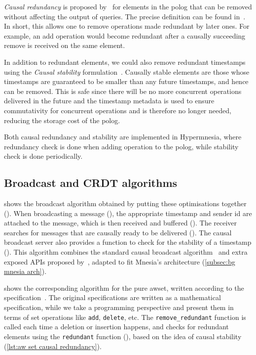 \emph{Causal redundancy} is proposed by~\citet{baquero2017PureOp} for elements in
the \acrshort{polog} that can be removed without affecting the output of
queries. The precise definition can be found in~\cite{baquero2017PureOp,baquero2014PureOp}. 
In short, this allows one to remove operations made redundant by later ones. For
example, an add operation would become redundant after a causally succeeding remove 
is received on the same element.

In addition to redundant elements, we could also remove redundant timestamps 
using the \emph{Causal stability} formulation~\citet{baquero2017PureOp}.
Causally stable elements are those whose timestamps are guaranteed to be smaller
than any future timestamps, and hence can be removed.
This is safe since there will be no more
concurrent operations delivered in the future and the timestamp metadata is
used to ensure commutativity for concurrent operations and is therefore no longer
needed, reducing the storage cost of the \acrshort{polog}.

Both causal redundancy and stability are implemented in Hypermnesia, where redundancy
check is done when adding operation to the \acrshort{polog}, while stability check 
is done periodically.

\subsection{Broadcast and CRDT algorithms} \label{subsec:impl pawset algorithm}

 shows the broadcast algorithm obtained by putting these optimisations
together (). 
When broadcasting a message (),
the appropriate timestamp and sender id are attached to the message, which is then
received and buffered (). The
receiver searches for messages that are causally ready to be delivered ().
The causal broadcast server also provides a function to check for the stability of a 
timestamp ().
This algorithm combines the standard causal broadcast
algorithm~\cite{birman1991causal,kleppmann2022dist-notes} and extra exposed 
APIs proposed by~\cite{baquero2014PureOp,baquero2017PureOp}, adapted to fit Mnesia's 
architecture (\cref{subsec:bg mnesia arch}).

 shows the corresponding algorithm for the pure \acrshort{awset},
written according to the specification~\cite{baquero2017PureOp,baquero2014PureOp}.
The original specifications
are written as a mathematical specification, while we take
a programming perspective and present them in terms of set operations like
\texttt{add}, \texttt{delete}, etc. The \verb|remove_redundant| function is called
each time a deletion or insertion happens, and checks
for redundant elements using the \verb|redundant| 
function (), based on the 
idea of causal stability (\cref{lst:aw set causal redundancy}).

